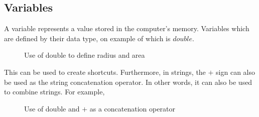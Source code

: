 \documentclass[11pt,a4 paper]{book}
\theoremstyle{plain}
\theoremstyle{definition}
\theoremstyle{remark}
\begin{document}
\begin{flushleft}
\section{Variables}
A variable represents a value stored in the computer’s memory. Variables which are defined by their data type, on example of which is $double$.
\begin{figure}[H]
\centering
{}
\label{fig:double}
\caption{Use of double to define radius and area}
\end{figure} 
This can be used to create shortcuts. Furthermore, in strings, the $+$ sign can also be used as the string concatenation operator. In other words, it can also be used to combine strings. For example,
\begin{figure}[H]
\centering
{}
\label{fig:example1}
\caption{Use of double and $+$ as a concatenation operator}
\end{figure} 

\end{flushleft}
\end{document}
